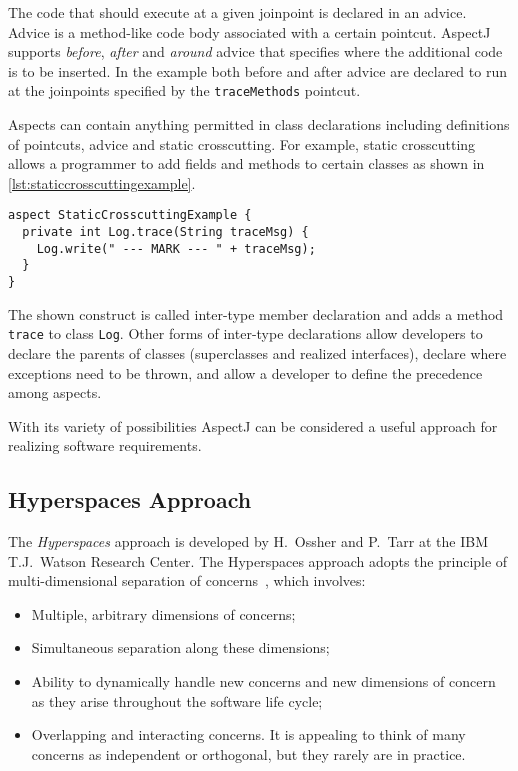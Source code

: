 The code that should execute at a given joinpoint is declared in an advice.
Advice is a method-like code body associated with a certain pointcut.
AspectJ supports \emph{before}, \emph{after} and \emph{around} advice that specifies where the additional code is to be inserted.
In the example both before and after advice are declared to run at the joinpoints specified by the \lstinline|traceMethods| pointcut.

Aspects can contain anything permitted in class declarations including definitions of pointcuts, advice and static crosscutting.
For example, static crosscutting allows a programmer to add fields and methods to certain classes as shown in \autoref{lst:staticcrosscuttingexample}.

\begin{lstlisting}[language={[AspectJ]Java},style=floatlisting,%
                   caption={Example of static crosscutting in AspectJ},%
                   label={lst:staticcrosscuttingexample},floatplacement=htbp]
aspect StaticCrosscuttingExample {
  private int Log.trace(String traceMsg) {
    Log.write(" --- MARK --- " + traceMsg);
  }
}
\end{lstlisting}

The shown construct is called inter-type member declaration and adds a method \lstinline|trace| to class \lstinline|Log|.
Other forms of inter-type declarations allow developers to declare the parents of classes (superclasses and realized interfaces), declare where exceptions need to be thrown, and allow a developer to define the precedence among aspects.

With its variety of possibilities AspectJ can be considered a useful approach for realizing software requirements.

\subsection{Hyperspaces Approach}

The \emph{Hyperspaces} approach is developed by H.~Ossher and P.~Tarr at the IBM T.J.~Watson Research Center.
The Hyperspaces approach adopts the principle of multi-dimensional separation of concerns~\cite{ossher:sact01}, which involves:
\begin{itemize}[noitemsep]
  \item Multiple, arbitrary dimensions of concerns;
  \item Simultaneous separation along these dimensions;
  \item Ability to dynamically handle new concerns and new dimensions of concern as they arise throughout the software life cycle;
  \item Overlapping and interacting concerns. It is appealing to think of many concerns as independent or orthogonal, but they rarely are in practice.
\end{itemize}

